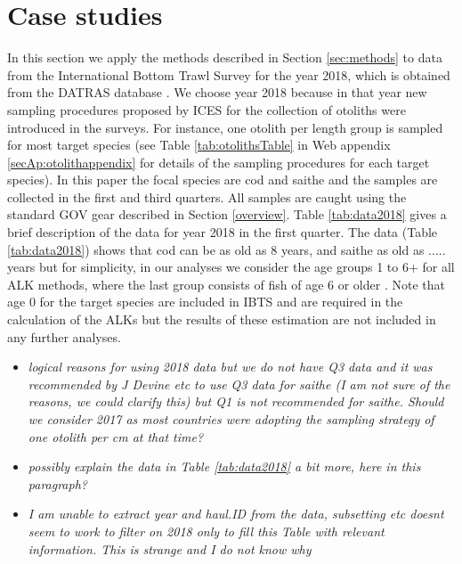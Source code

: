 \documentclass[a4paper 12pt]{article}
\numberwithin{equation}{section}
\begin{document}
\section{Case studies}
\label{sec:data}
In this section we apply the methods described in Section \ref{sec:methods} to data from the International Bottom Trawl Survey for the year 2018, which is obtained from the DATRAS database \citep{datras}. We choose year 2018 because in that year new sampling procedures proposed by ICES for the collection of otoliths were introduced in the surveys. For instance, one otolith per length group is sampled for most target species (see Table \ref{tab:otolithsTable} in Web appendix \ref{secAp:otolithappendix} for details of the sampling procedures for each target species). In this paper the focal species are cod and saithe and the samples are collected in the first and third quarters. All samples are caught using the standard GOV gear described in Section \ref{overview}. Table \ref{tab:data2018} gives a brief description of the data for year 2018 in the first quarter.  The data (Table \ref{tab:data2018}) shows that cod can be as old as 8 years, and saithe as old as ..... years but for simplicity, in our analyses we consider the age groups 1 to 6+ for all ALK methods, where the last group consists of fish of age 6 or older . Note that age 0 for the target species are included in IBTS and are required in the calculation of the ALKs but the results of these estimation are not included in any further analyses.

\begin{itemize}
\item \emph{logical reasons for using 2018 data but we do not have Q3 data and it was recommended by J Devine etc to use Q3 data for saithe (I am not sure of the reasons, we could clarify this) but Q1 is not recommended for saithe. Should we consider 2017 as most countries were adopting the sampling strategy of one otolith per cm at that time?}
\item \emph{possibly explain the data in Table \ref{tab:data2018} a bit more, here in this paragraph?}
\item \emph{I am unable to extract year and haul.ID from the data, subsetting etc doesnt seem to work to filter on 2018 only to fill this Table with relevant information. This is strange and I do not know why}
\end{itemize}
\end{document}
